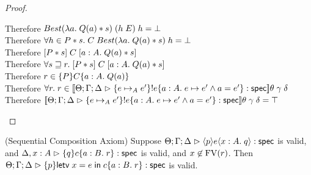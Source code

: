 \begin{proof}
\begin{tabbedproof}
    \oooooo Therefore $Best(\semfun{a}{Q(a)*s})\;(h\;E)\;h = \bot$ \\
    \ooooo Therefore $\forall h \in P*s.\; C\;Best(\semfun{a}{Q(a)*s})\;h = \bot$ \\
    \ooooo Therefore $\basicspec{P*s}{C}{a:A}{Q(a)*s}$ \\
    \oooo Therefore $\forall s \sqsupseteq r.\; \basicspec{P*s}{C}{a:A}{Q(a)*s}$ \\
    \oooo Therefore $r \in \spec{P}{C}{a:A}{Q(a)}$ \\
    \ooo Therefore $\forall r.\; r \in \interp{\judgeS{\spec{e \pointsto_A e'}{!e}{a:A}{e \pointsto e' \land a = e'}}}\theta\;\gamma\;\delta$ \\
    \ooo Therefore $\interp{\judgeS{\spec{e \pointsto_A e'}{!e}{a:A}{e \pointsto e' \land a = e'}}}\theta\;\gamma\;\delta = \top$ \\
  \end{tabbedproof}
\end{proof}

\begin{lemma}{(Sequential Composition Axiom)}
Suppose $\judgeS{\mspec{p}{e}{x:A}{q}}$ is valid, and $\judgeS[\Delta,x:A]{\spec{q}{c}{a:B}{r}}$ is valid, and $x \not\in \FV{r}$. Then $\judgeS{\spec{p}{\letv{x}{e}{c}}{a:B}{r}}$ is valid. 
\end{lemma}

